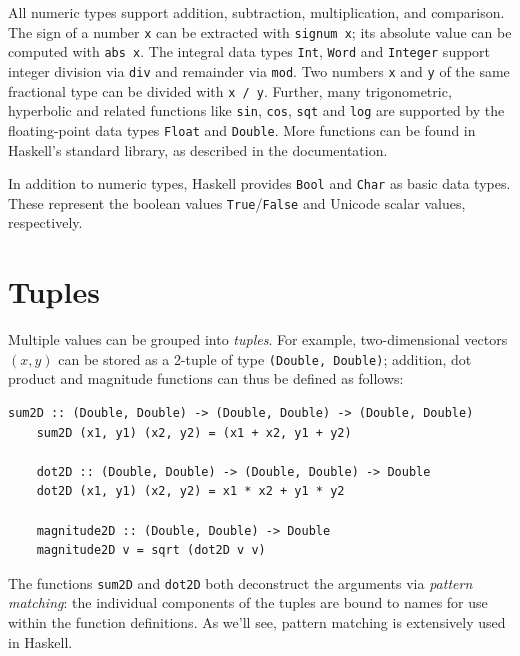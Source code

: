 \documentclass[UdineBachThesis,american,11pt]{PhdThesis}
\begin{document}
  All numeric types support addition, subtraction, multiplication, and
  comparison. The sign of a number \texttt{x} can be extracted with
  \mbox{\texttt{signum x}}; its absolute value can be computed with
  \mbox{\texttt{abs x}}. The integral data types \mbox{\texttt{Int}},
  \mbox{\texttt{Word}} and \mbox{\texttt{Integer}} support integer division via
  \mbox{\texttt{div}} and remainder via \mbox{\texttt{mod}}. Two numbers
  \texttt{x} and \texttt{y} of the same fractional type can be divided with
  \mbox{\texttt{x / y}}. Further, many trigonometric, hyperbolic and related
  functions like \mbox{\texttt{sin}}, \mbox{\texttt{cos}}, \mbox{\texttt{sqt}}
  and \mbox{\texttt{log}} are supported by the floating-point data types
  \mbox{\texttt{Float}} and \mbox{\texttt{Double}}. More functions can be found
  in Haskell's standard library, as described in the documentation.

  In addition to numeric types, Haskell provides \mbox{\texttt{Bool}} and
  \mbox{\texttt{Char}} as basic data types. These represent the boolean values
  \mbox{\texttt{True}}/\mbox{\texttt{False}} and Unicode scalar values,
  respectively.

  \section{Tuples}

  Multiple values can be grouped into \emph{tuples}. For example,
  two-dimensional vectors \mbox{$\left(x, y\right)$} can be stored as a 2-tuple
  of type \mbox{\texttt{(Double, Double)}}; addition, dot product and magnitude
  functions can thus be defined as follows:

  \begin{Verbatim}[gobble=4,fontsize=\small]
    sum2D :: (Double, Double) -> (Double, Double) -> (Double, Double)
    sum2D (x1, y1) (x2, y2) = (x1 + x2, y1 + y2)

    dot2D :: (Double, Double) -> (Double, Double) -> Double
    dot2D (x1, y1) (x2, y2) = x1 * x2 + y1 * y2

    magnitude2D :: (Double, Double) -> Double
    magnitude2D v = sqrt (dot2D v v)
  \end{Verbatim}

  The functions \mbox{\texttt{sum2D}} and \mbox{\texttt{dot2D}} both deconstruct
  the arguments via \emph{pattern matching}: the individual components of the
  tuples are bound to names for use within the function definitions. As we'll
  see, pattern matching is extensively used in Haskell.
\end{document}
